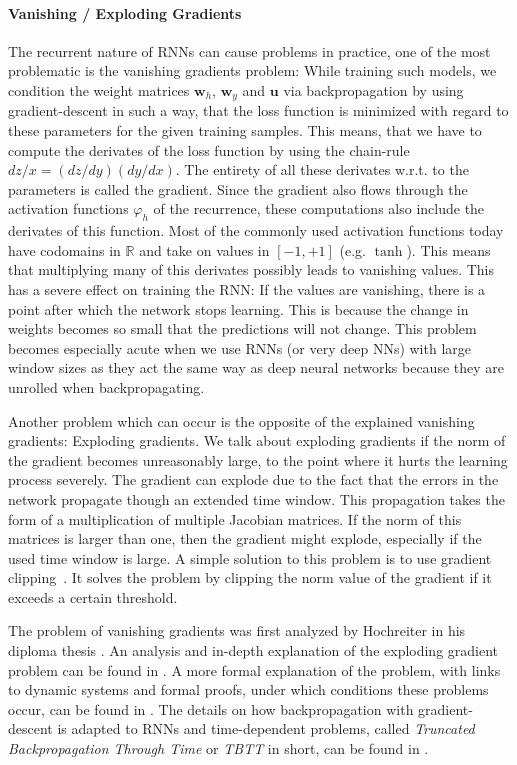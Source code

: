 \paragraph{Vanishing / Exploding Gradients} The recurrent nature of RNNs can cause problems in practice, one of the most problematic is the vanishing gradients problem: While training such models, we condition the weight matrices $\mathbf{w}_h$, $\mathbf{w}_y$ and $\mathbf{u}$ via backpropagation by using gradient-descent in such a way, that the loss function is minimized with regard to these parameters for the given training samples. This means, that we have to compute the derivates of the loss function by using the chain-rule $dz/x = (dz/dy)(dy/dx)$. The entirety of all these derivates w.r.t. to the parameters is called the gradient. Since the gradient also flows through the activation functions $\varphi_h$ of the recurrence, these computations also include the derivates of this function. Most of the commonly used activation functions today have codomains in $\mathbb{R}$ and take on values in $[-1, +1]$ (e.g. $\operatorname{tanh}$). This means that multiplying many of this derivates possibly leads to vanishing values. This has a severe effect on training the RNN: If the values are vanishing, there is a point after which the network stops learning. This is because the change in weights becomes so small that the predictions will not change. This problem becomes especially acute when we use RNNs (or very deep NNs) with large window sizes as they act the same way as deep neural networks because they are unrolled when backpropagating.

Another problem which can occur is the opposite of the explained vanishing gradients: Exploding gradients. We talk about exploding gradients if the norm of the gradient becomes unreasonably large, to the point where it hurts the learning process severely. The gradient can explode due to the fact that the errors in the network propagate though an extended time window. This propagation takes the form of a multiplication of multiple Jacobian matrices. If the norm of this matrices is larger than one, then the gradient might explode, especially if the used time window is large. A simple solution to this problem is to use gradient clipping~\cite{Pascanu:2013}. It solves the problem by clipping the norm value of the gradient if it exceeds a certain threshold.

The problem of vanishing gradients was first analyzed by Hochreiter in his diploma thesis \cite{Hochreiter:1991}. An analysis and in-depth explanation of the exploding gradient problem can be found in \cite{Pascanu:2012}. A more formal explanation of the problem, with links to dynamic systems and formal proofs, under which conditions these problems occur, can be found in \cite{Pascanu:2013}. The details on how backpropagation with gradient-descent is adapted to RNNs and time-dependent problems, called \emph{Truncated Backpropagation Through Time} or \emph{TBTT} in short, can be found in \cite{Werbos:1990}.

